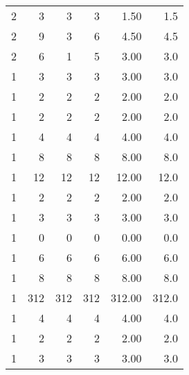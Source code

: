 \begin{tabular}{rrrrrr}
         2 &           3 &    3 &    3 &   1.50 &      1.5 \\
         2 &           9 &    3 &    6 &   4.50 &      4.5 \\
         2 &           6 &    1 &    5 &   3.00 &      3.0 \\
         1 &           3 &    3 &    3 &   3.00 &      3.0 \\
         1 &           2 &    2 &    2 &   2.00 &      2.0 \\
         1 &           2 &    2 &    2 &   2.00 &      2.0 \\
         1 &           4 &    4 &    4 &   4.00 &      4.0 \\
         1 &           8 &    8 &    8 &   8.00 &      8.0 \\
         1 &          12 &   12 &   12 &  12.00 &     12.0 \\
         1 &           2 &    2 &    2 &   2.00 &      2.0 \\
         1 &           3 &    3 &    3 &   3.00 &      3.0 \\
         1 &           0 &    0 &    0 &   0.00 &      0.0 \\
         1 &           6 &    6 &    6 &   6.00 &      6.0 \\
         1 &           8 &    8 &    8 &   8.00 &      8.0 \\
         1 &         312 &  312 &  312 & 312.00 &    312.0 \\
         1 &           4 &    4 &    4 &   4.00 &      4.0 \\
         1 &           2 &    2 &    2 &   2.00 &      2.0 \\
         1 &           3 &    3 &    3 &   3.00 &      3.0 \\
\bottomrule
\end{tabular}
